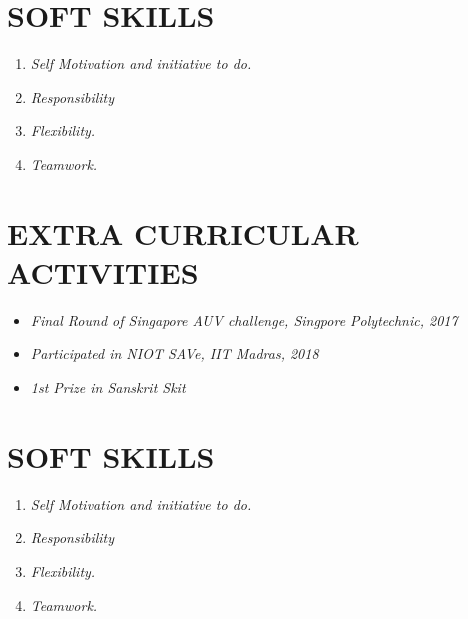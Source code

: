 \documentclass[margin]{res}
\begin{document}
\begin{resume}
\section{SOFT SKILLS }\begin{enumerate}
\item{\sl Self Motivation and initiative to do.}
\item{\sl Responsibility}
\item{\sl Flexibility.}
\item{\sl Teamwork.}
\end{enumerate}

\section{EXTRA CURRICULAR ACTIVITIES}\begin{itemize}
\item{\sl Final Round of Singapore AUV challenge, Singpore Polytechnic, 2017}
\item{\sl Participated in NIOT SAVe, IIT Madras, 2018}
\item{\sl 1st Prize in Sanskrit Skit}
\end{itemize}

\section{SOFT SKILLS }\begin{enumerate}
\item{\sl Self Motivation and initiative to do.}
\item{\sl Responsibility}
\item{\sl Flexibility.}
\item{\sl Teamwork.}
\end{enumerate}



\end{resume}
\end{document}

